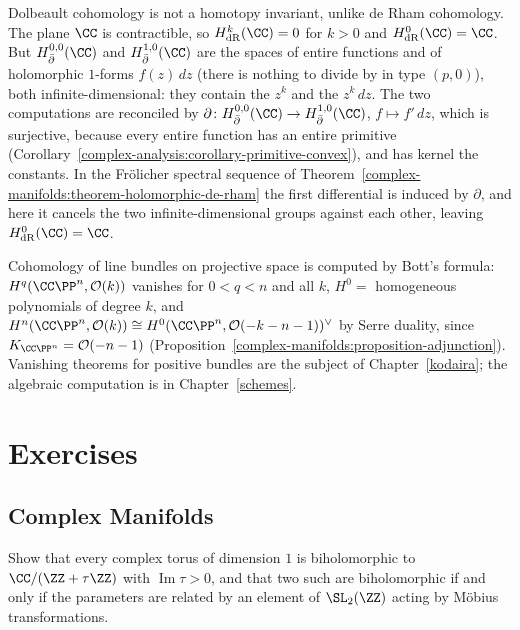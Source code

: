 \begin{counterexample}\label{complex-manifolds:counterexample-not-homotopy-invariant}
Dolbeault cohomology is not a homotopy invariant, unlike de Rham cohomology. The plane $\CC$ is contractible, so $H^k_{\mathrm{dR}}(\CC) = 0$ for $k > 0$ and $H^0_{\mathrm{dR}}(\CC) = \CC$. But
$H^{0,0}_{\bar\partial}(\CC)$ and $H^{1,0}_{\bar\partial}(\CC)$ are the spaces of entire functions and of holomorphic $1$-forms $f(z)\,dz$ (there is nothing to divide by in type $(p,0)$), both
infinite-dimensional: they contain the $z^k$ and the $z^k\,dz$. The two computations are reconciled by $\partial \colon H^{0,0}_{\bar\partial}(\CC) \to H^{1,0}_{\bar\partial}(\CC)$, $f \mapsto f'\,dz$, which is
surjective, because every entire function has an entire primitive (Corollary~\ref{complex-analysis:corollary-primitive-convex}), and has kernel the constants. In the Fr\"olicher spectral sequence of Theorem~\ref{complex-manifolds:theorem-holomorphic-de-rham} the first differential is induced
by $\partial$, and here it cancels the two infinite-dimensional groups against each other, leaving $H^0_{\mathrm{dR}}(\CC) = \CC$.
\end{counterexample}

\begin{remark}\label{complex-manifolds:remark-vanishing}
Cohomology of line bundles on projective space is computed by Bott's formula: $H^q(\CC\PP^n, \mathcal{O}(k))$ vanishes for $0 < q < n$ and all $k$, $H^0 = $ homogeneous polynomials of degree $k$, and
$H^n(\CC\PP^n, \mathcal{O}(k)) \cong H^0(\CC\PP^n, \mathcal{O}(-k-n-1))^\vee$ by Serre duality, since $K_{\CC\PP^n} = \mathcal{O}(-n-1)$ (Proposition~\ref{complex-manifolds:proposition-adjunction}).
Vanishing theorems for positive bundles are the subject of Chapter~\ref{kodaira}; the algebraic computation is in Chapter~\ref{schemes}.
\end{remark}

\section{Exercises}\label{complex-manifolds:section-exercises}

\subsection{Complex Manifolds}\label{complex-manifolds:subsection-exercises-complex-manifolds}

\begin{exercise}\label{complex-manifolds:exercise-tori}
Show that every complex torus of dimension $1$ is biholomorphic to $\CC/(\ZZ + \tau\ZZ)$ with $\operatorname{Im}\tau > 0$, and that two such are biholomorphic if and only if the parameters are related by
an element of $\SL_2(\ZZ)$ acting by M\"obius transformations.
\end{exercise}

